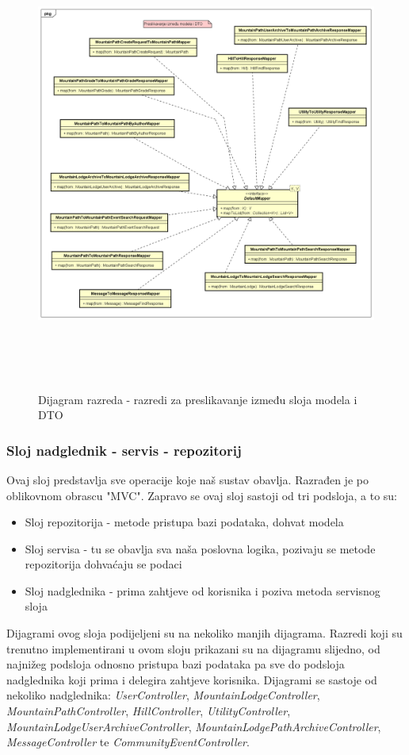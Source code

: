 		\begin{figure}[H]
			\includegraphics[scale=0.6, height=150mm, width=165mm]{dijagrami/model-mapper.png} %
			\centering
			\caption{Dijagram razreda - razredi za preslikavanje između sloja modela i DTO}
			\label{fig:dijagrami_razreda3}
		\end{figure}
			\newpage
			\subsubsection{Sloj nadglednik - servis - repozitorij}
			Ovaj sloj predstavlja sve operacije koje naš sustav obavlja. Razrađen je po oblikovnom obrascu "MVC". Zapravo se ovaj sloj sastoji od tri podsloja, a to su: 
			\begin{itemize}
				\item 
					Sloj repozitorija - metode pristupa bazi podataka, dohvat modela
				\item
					Sloj servisa - tu se obavlja sva naša poslovna logika, pozivaju se metode repozitorija dohvaćaju se podaci
				\item Sloj nadglednika - prima zahtjeve od korisnika i poziva metoda servisnog sloja	
			\end{itemize}
			Dijagrami ovog sloja podijeljeni su na nekoliko manjih dijagrama.
			Razredi koji su trenutno implementirani u ovom sloju prikazani su na dijagramu slijedno, od najnižeg podsloja odnosno pristupa bazi podataka pa sve do podsloja nadglednika koji prima i delegira zahtjeve korisnika.
			Dijagrami se sastoje od nekoliko nadglednika: \textit{UserController}, \textit{MountainLodgeController}, \textit{MountainPathController}, \textit{HillController}, \textit{UtilityController}, \textit{MountainLodgeUserArchiveController}, \textit{MountainLodgePathArchiveController}, \textit{MessageController} te \textit{CommunityEventController}.
			
